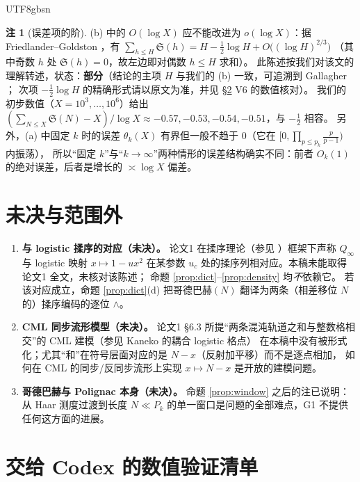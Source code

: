 \documentclass[11pt,a4paper]{article}
\newcommand{\Sing}{\mathfrak S}
\theoremstyle{plain}
\theoremstyle{definition}
\newtheorem{rem}[prop]{注}
\begin{document}
\begin{CJK}{UTF8}{gbsn}
\begin{rem}[误差项的阶]\label{rem:FG}
(b) 中的 $O(\log X)$ 应不能改进为 $o(\log X)$：据 Friedlander--Goldston \cite{FG95}，有
$\sum_{h\le H}\Sing(h)=H-\tfrac12\log H+O\bigl((\log H)^{2/3}\bigr)$
（其中奇数 $h$ 处 $\Sing(h)=0$，故左边即对偶数 $h\le H$ 求和）。
此陈述按我们对该文的理解转述，状态：\textbf{部分}（结论的主项 $H$ 与我们的 (b) 一致，可追溯到 Gallagher \cite{Gal76}；
次项 $-\frac12\log H$ 的精确形式请以原文为准，并见 \S\ref{sec:numerics} V6 的数值核对）。
我们的初步数值（$X=10^3,\dots,10^6$）给出 $(\sum_{N\le X}\Sing(N)-X)/\log X\approx-0.57,-0.53,-0.54,-0.51$，与 $-\frac12$ 相容。
另外，(a) 中固定 $k$ 时的误差 $\theta_k(X)$ 有界但一般不趋于 $0$（它在 $[0,\prod_{p\le p_k}\frac p{p-1})$ 内振荡），
所以“固定 $k$”与“$k\to\infty$”两种情形的误差结构确实不同：前者 $O_k(1)$ 的绝对误差，后者是增长的 $\asymp\log X$ 偏差。
\end{rem}

\section{未决与范围外}\label{sec:open}

\begin{enumerate}[leftmargin=*]
\item \textbf{与 logistic 揉序的对应（未决）。} 论文1 \cite{Wang26} 在揉序理论（参见 \cite{MSS73}）框架下声称 $Q_\infty$ 与 logistic 映射
$x\mapsto1-ux^2$ 在某参数 $u_c$ 处的揉序列相对应。本稿未能取得论文1 全文，未核对该陈述；
命题 \ref{prop:dict}--\ref{prop:density} 均\emph{不}依赖它。
若该对应成立，命题 \ref{prop:dict}(d) 把哥德巴赫$(N)$ 翻译为两条（相差移位 $N$ 的）揉序编码的逐位 $\wedge$。
\item \textbf{CML 同步流形模型（未决）。} 论文1 \S6.3 所提“两条混沌轨道之和与整数格相交”的 CML 建模（参见 Kaneko \cite{Kan84} 的耦合 logistic 格点）
在本稿中没有被形式化；尤其“和”在符号层面对应的是 $N-x$（反射加平移）而不是逐点相加，
如何在 CML 的同步/反同步流形上实现 $x\mapsto N-x$ 是开放的建模问题。
\item \textbf{哥德巴赫与 Polignac 本身（未决）。} 命题 \ref{prop:window} 之后的注已说明：
从 Haar 测度过渡到长度 $N\ll P_k$ 的单一窗口是问题的全部难点，G1 不提供任何这方面的进展。
\end{enumerate}

\section{交给 Codex 的数值验证清单}\label{sec:numerics}


\end{CJK}
\end{document}
